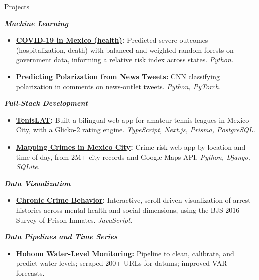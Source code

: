 \documentclass{resume} %
\begin{document}
\begin{rSection}{Projects}

\textbf{\textit{Machine Learning}}
\begin{itemize}
    \setlength{\itemsep}{-0.4em}

    \item \textbf{\href{https://github.com/jesy-codes/covid-mex}{COVID-19 in Mexico (health)}:}
    {\small
    Predicted severe outcomes (hospitalization, death) with balanced and
    weighted random forests on government data, informing a relative risk
    index across states. \textit{Python.}
    }

    \item \textbf{\href{https://github.com/advanced-ml-project/project}{Predicting Polarization from News Tweets}:}
    {\small
    CNN classifying polarization in comments on news-outlet tweets.
    \textit{Python, PyTorch.}
    }

\end{itemize}

\smallskip
\textbf{\textit{Full-Stack Development}}
\begin{itemize}
    \setlength{\itemsep}{-0.4em}

    \item \textbf{\href{https://www.tenislat.com}{TenisLAT}:}
    {\small
    Built a bilingual web app for amateur tennis leagues in Mexico City, with
    a Glicko-2 rating engine.
    \textit{TypeScript, Next.js, Prisma, PostgreSQL.}
    }

    \item \textbf{\href{https://github.com/jramtos/mexcrimes}{Mapping Crimes in Mexico City}:}
    {\small
    Crime-risk web app by location and time of day, from 2M+ city records
    and Google Maps API. \textit{Python, Django, SQLite.}
    }

\end{itemize}

\smallskip
\textbf{\textit{Data Visualization}}
\begin{itemize}
    \setlength{\itemsep}{-0.4em}

    \item \textbf{\href{https://jramtos.github.io/dynamic_vis/}{Chronic Crime Behavior}:}
    {\small
    Interactive, scroll-driven visualization of arrest histories across mental
    health and social dimensions, using the BJS 2016 Survey of Prison Inmates.
    \textit{JavaScript.}
    }

\end{itemize}

\smallskip
\textbf{\textit{Data Pipelines and Time Series}}
\begin{itemize}
    \setlength{\itemsep}{-0.4em}

    \item \textbf{\href{https://www.youtube.com/watch?v=Xzz5Nq3ZxFI}{Hohonu Water-Level Monitoring}:}
    {\small
    Pipeline to clean, calibrate, and predict water levels; scraped 200+ URLs
    for datums; improved VAR forecasts.
    }

\end{itemize}

\end{rSection}
\end{document}
